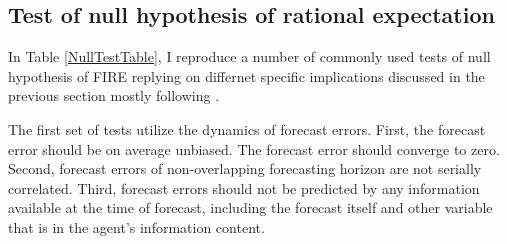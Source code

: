 \documentclass[]{article}
\begin{document}
\subsection{Test of null hypothesis of rational expectation}

In Table \ref{NullTestTable}, I reproduce a number of commonly used tests of null hypothesis of FIRE replying on differnet specific implications discussed in the previous section mostly following \citet{mankiw2003disagreement}. 

The first set of tests utilize the dynamics of forecast errors. First, the forecast error should be on average unbiased. The forecast error should converge to zero. Second, forecast errors of non-overlapping forecasting horizon are not serially correlated.  Third, forecast errors should not be predicted by any information available at the time of forecast, including the forecast itself and other variable that is in the agent's information content. 
\end{document}
